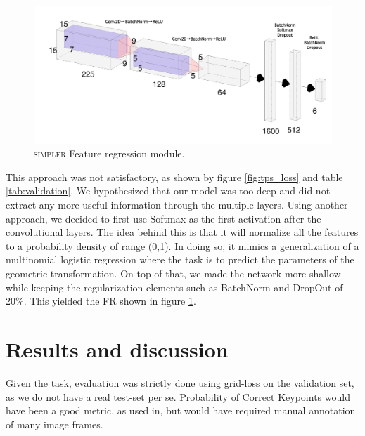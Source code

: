 \documentclass[10pt,conference,compsocconf]{IEEEtran}
\begin{document}
\vspace{-0.2cm}
\begin{figure}[h!]
    \centering
    \includegraphics[scale = 0.19]{simpler_fr.png}
    \vspace{-0.5cm}
    \caption{\textsc{simpler} Feature regression module.}
    \label{fig:simpler_fr}
\end{figure}

This approach was not satisfactory, as shown by figure \ref{fig:tps_loss} and table \ref{tab:validation}. We hypothesized that our model was too deep and did not extract any more useful information through the multiple layers. Using another approach, we decided to first use Softmax as the first activation after the convolutional layers. The idea behind this is that it will normalize all the features to a probability density of range (0,1). In doing so, it mimics a generalization of a multinomial logistic regression where the task is to predict the parameters of the geometric transformation. On top of that, we made the network more shallow while keeping the regularization elements such as BatchNorm and DropOut of 20\%. This yielded the FR shown in figure \ref{fig:simpler_fr}.

\section{\textbf{Results and discussion}}

Given the task, evaluation was strictly done using grid-loss on the validation set, as we do not have a real test-set per se. Probability of Correct Keypoints would have been a good metric, as used in\cite{roccoConvolutionalNeuralNetwork2017}, but would have required manual annotation of many image frames.
\end{document}
